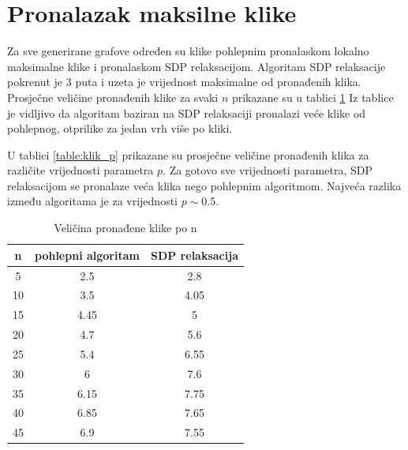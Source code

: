 \documentclass[diplomskirad]{fer}
\begin{document}
\section{Pronalazak maksilne klike}
Za sve generirane grafove određen su klike pohlepnim pronalaskom lokalno maksimalne klike i pronalaskom SDP relaksacijom. Algoritam SDP relaksacije pokrenut je 3 puta
i uzeta je vrijednost maksimalne od pronađenih klika. Prosječne veličine pronađenih klike za svaki $n$ prikazane su u tablici \ref{table:klik_n}
Iz tablice je vidljivo da algoritam baziran na SDP relaksaciji pronalazi veće klike od pohlepnog, otprilike za jedan vrh više po kliki.

U tablici \ref{table:klik_p} prikazane su prosječne veličine pronađenih klika za različite vrijednosti parametra $p$. Za gotovo sve vrijednosti
parametra, SDP relaksacijom se pronalaze veća klika nego pohlepnim algoritmom. Najveća razlika između algoritama je za vrijednosti $p \sim 0.5$.

\begin{table}
  \caption{Veličina pronađene klike po n}
  \label{table:klik_n}
  \centering
  \begin{tabular}{|c|c|c|}
    \hline
    n & pohlepni algoritam & SDP relaksacija \\
    \hline
    \hline
    5 & 2.5 & 2.8 \\
    \hline
    10 & 3.5 & 4.05 \\
    \hline
    15 & 4.45 & 5 \\
    \hline
    20 & 4.7 & 5.6 \\
    \hline
    25 & 5.4 & 6.55 \\
    \hline
    30 & 6 & 7.6 \\
    \hline
    35 & 6.15 & 7.75 \\
    \hline
    40 & 6.85 & 7.65 \\
    \hline
    45 & 6.9 & 7.55 \\
    \hline
  \end{tabular}
\end{table}
\end{document}
